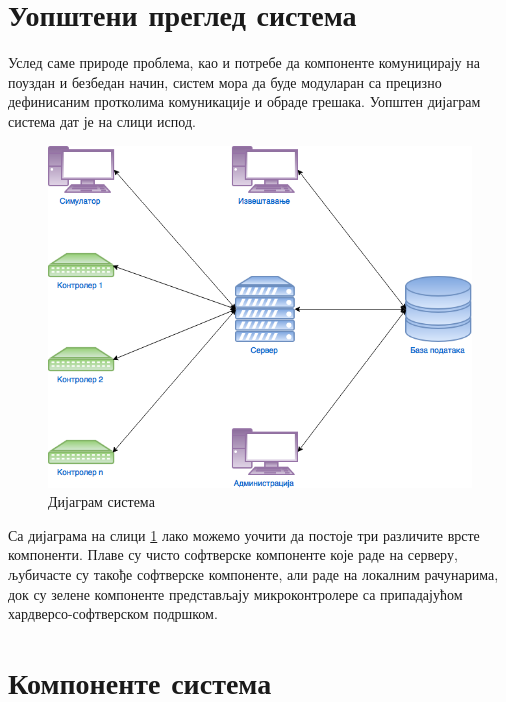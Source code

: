 \documentclass[a4paper, 12pt, diplomski]{etfcyr}
\begin{document}
		\section{Уопштени преглед система}
			\begin{justify}
				Услед саме природе проблема, као и потребе да компоненте комуницирају на поуздан и безбедан начин, систем мора да буде модуларан са прецизно дефинисаним протколима комуникације и обраде грешака. Уопштен дијаграм система дат је на слици испод.

				\begin{figure}[h]
					\begin{center}
						\includegraphics[scale=0.47]{SystemOverview.png}
					\end{center}
					\caption{Дијаграм система}
					\label{figure:1}
				\end{figure}

				Са дијаграма на слици \ref{figure:1} лако можемо уочити да постоје три различите врсте компоненти. Плаве су чисто софтверске компоненте које раде на серверу, љубичасте су такође софтверске компоненте, али раде на локалним рачунарима, док су зелене компоненте представљају микроконтролере са припадајућом хардверсо-софтверском подршком.
			\end{justify}

		\section{Компоненте система}
\end{document}
